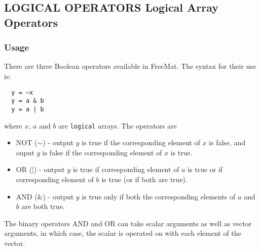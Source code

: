 %
%
%
\subsection{LOGICAL OPERATORS Logical Array Operators}
\subsubsection{Usage}
There are three Boolean operators available in FreeMat.  The syntax for their use is:
\begin{verbatim}
  y = ~x
  y = a & b
  y = a | b
\end{verbatim}
where $x$, $a$ and $b$ are \verb|logical| arrays.  The operators are
\begin{itemize}
\item NOT ($\sim$) - output $y$ is true if the corresponding element of $x$ is false, and ouput $y$ is false if the corresponding element of $x$ is true.
\item OR ($|$) - output $y$ is true if corresponding element of $a$ is true or if corresponding element of $b$ is true (or if both are true).
\item AND ($\&$) - output $y$ is true only if both the corresponding elements of $a$ and $b$ are both true.
\end{itemize}
The binary operators AND and OR can take scalar arguments as well as vector arguments, in which case, the scalar is operated on with each element of the vector.
